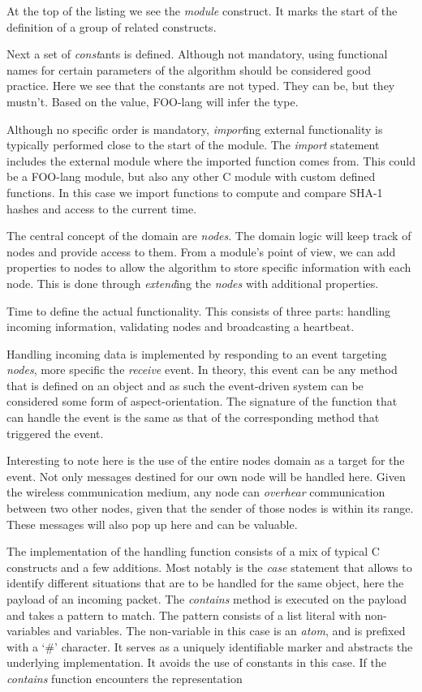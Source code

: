 \documentclass[conference]{IEEEtran}
\begin{document}
At the top of the listing we see the \emph{module} construct. It marks the
start of the definition of a group of related constructs.

Next a set of \emph{const}ants is defined. Although not mandatory, using
functional names for certain parameters of the algorithm should be considered
good practice. Here we see that the constants are not typed. They can be, but
they mustn't. Based on the value, FOO-lang will infer the type.

Although no specific order is mandatory, \emph{import}ing external
functionality is typically performed close to the start of the module. The
\emph{import} statement includes the external module where the imported
function comes from. This could be a FOO-lang module, but also any other C
module with custom defined functions. In this case we import functions to
compute and compare SHA-1 hashes and access to the current time.

The central concept of the domain are \emph{nodes}. The domain logic will keep
track of nodes and provide access to them. From a module's point of view, we
can add properties to nodes to allow the algorithm to store specific
information with each node. This is done through \emph{extend}ing the
\emph{nodes} with additional properties.

Time to define the actual functionality. This consists of three parts: handling
incoming information, validating nodes and broadcasting a heartbeat.

Handling incoming data is implemented by responding to an event targeting
\emph{nodes}, more specific the \emph{receive} event. In theory, this event can
be any method that is defined on an object and as such the event-driven system
can be considered some form of aspect-orientation. The signature of the
function that can handle the event is the same as that of the corresponding
method that triggered the event.

Interesting to note here is the use of the entire nodes domain as a target for
the event. Not only messages destined for our own node will be handled here.
Given the wireless communication medium, any node can \emph{overhear}
communication between two other nodes, given that the sender of those nodes is
within its range. These messages will also pop up here and can be valuable.

The implementation of the handling function consists of a mix of typical C
constructs and a few additions. Most notably is the \emph{case} statement that
allows to identify different situations that are to be handled for the same
object, here the payload of an incoming packet. The \emph{contains} method is
executed on the payload and takes a pattern to match. The pattern consists of a
list literal with non-variables and variables. The non-variable in this case is
an \emph{atom}, and is prefixed with a `\#' character. It serves as a uniquely
identifiable marker and abstracts the underlying implementation. It avoids the
use of constants in this case. If the \emph{contains} function encounters the
representation
\end{document}
